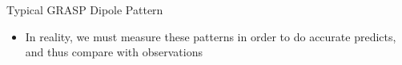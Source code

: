 \documentclass[pdf,azure,slideColor,colorBG]{prosper}
\begin{document}
\begin{slide}{Typical GRASP Dipole Pattern}
\begin{small}
\begin{itemize}
\item In reality, we must measure these patterns in order to do accurate
predicts, and thus compare with observations
\end{itemize}
\end {small}
{\centering
{}
\par}
\end{slide}
\end{document}
